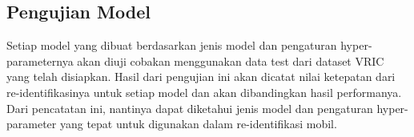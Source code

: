 \subsection{Pengujian Model}

Setiap model yang dibuat berdasarkan jenis model dan pengaturan hyper-parameternya akan diuji cobakan menggunakan data test 
dari dataset VRIC yang telah disiapkan. Hasil dari pengujian ini akan dicatat nilai ketepatan dari re-identifikasinya 
untuk setiap model dan akan dibandingkan hasil performanya. Dari pencatatan ini, nantinya dapat diketahui jenis model dan 
pengaturan hyper-parameter yang tepat untuk digunakan dalam re-identifikasi mobil.





% 


